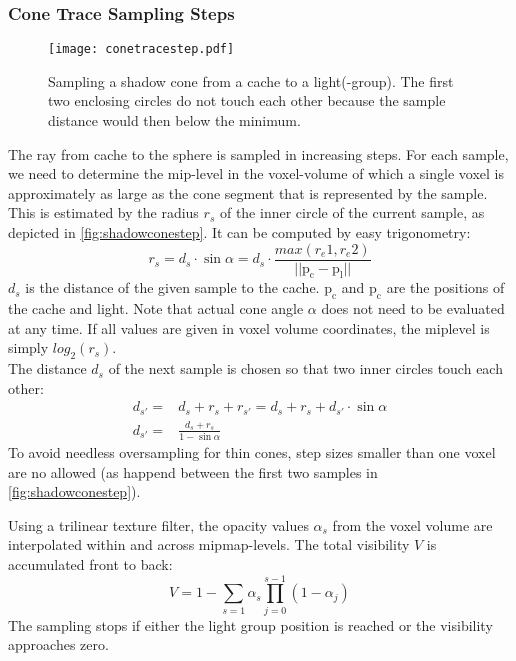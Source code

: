 \documentclass[thesis.tex]{subfiles}
\begin{document}
\subsubsection{Cone Trace Sampling Steps}
\begin{figure}[h]
	\centering
	\texttt{[image: conetracestep.pdf]}
	\caption{Sampling a shadow cone from a cache to a light(-group). The first two enclosing circles do not touch each other because the sample distance would then below the minimum.} \label{fig:shadowconestep}
\end{figure}
The ray from cache to the sphere is sampled in increasing steps.
For each sample, we need to determine the mip-level in the voxel-volume of which a single voxel is approximately as large as the cone segment that is represented by the sample.
This is estimated by the radius $r_s$ of the inner circle of the current sample, as depicted in \autoref{fig:shadowconestep}.
It can be computed by easy trigonometry:
\begin{equation}
r_s = d_s \cdot \sin \alpha = d_s \cdot \frac{max(r_e1, r_e2)}{||\mathrm{p_c} - \mathrm{p_l}||}
\end{equation}
$d_s$ is the distance of the given sample to the cache. $\mathrm{p_c}$ and $\mathrm{p_c}$ are the positions of the cache and light.
Note that actual cone angle $\alpha$ does not need to be evaluated at any time.
If all values are given in voxel volume coordinates, the miplevel is simply $log_2(r_s)$.\\
The distance $d_s$ of the next sample is chosen so that two inner circles touch each other:
\begin{align}
d_{s'} =& d_s + r_s + r_{s'} = d_s + r_s + d_{s'} \cdot \sin \alpha\\
d_{s'} =& \frac{d_s + r_s}{1-\sin\alpha}
\end{align}
To avoid needless oversampling for thin cones, step sizes smaller than one voxel are no allowed (as happend between the first two samples in \autoref{fig:shadowconestep}).

Using a trilinear texture filter, the opacity values $\alpha_s$ from the voxel volume are interpolated within and across mipmap-levels.
The total visibility $V$ is accumulated front to back:
\begin{equation}
V = 1 - \sum\limits_{s=1}\alpha_s \prod\limits_{j=0}^{s-1}(1-\alpha_j)
\end{equation}
The sampling stops if either the light group position is reached or the visibility approaches zero.
\end{document}
